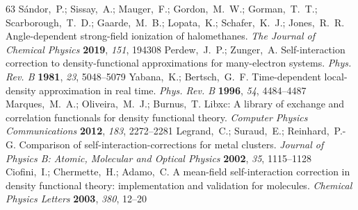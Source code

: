 \documentclass[journal=jacsat,manuscript=article]{achemso}
\begin{document}
\begin{mcitethebibliography}{63}
\EndOfBibitem
{}
S\'{a}ndor,~P.; Sissay,~A.; Mauger,~F.; Gordon,~M.~W.; Gorman,~T.~T.;
  Scarborough,~T.~D.; Gaarde,~M.~B.; Lopata,~K.; Schafer,~K.~J.; Jones,~R.~R.
  Angle-dependent strong-field ionization of halomethanes. \emph{The Journal of
  Chemical Physics} \textbf{2019}, \emph{151}, 194308\relax
\mciteBstWouldAddEndPuncttrue
\mciteSetBstMidEndSepPunct{\mcitedefaultmidpunct}
{\mcitedefaultendpunct}{\mcitedefaultseppunct}\relax
\EndOfBibitem
{}
Perdew,~J.~P.; Zunger,~A. Self-interaction correction to density-functional
  approximations for many-electron systems. \emph{Phys. Rev. B} \textbf{1981},
  \emph{23}, 5048--5079\relax
\mciteBstWouldAddEndPuncttrue
\mciteSetBstMidEndSepPunct{\mcitedefaultmidpunct}
{\mcitedefaultendpunct}{\mcitedefaultseppunct}\relax
\EndOfBibitem
{}
Yabana,~K.; Bertsch,~G.~F. Time-dependent local-density approximation in real
  time. \emph{Phys. Rev. B} \textbf{1996}, \emph{54}, 4484--4487\relax
\mciteBstWouldAddEndPuncttrue
\mciteSetBstMidEndSepPunct{\mcitedefaultmidpunct}
{\mcitedefaultendpunct}{\mcitedefaultseppunct}\relax
\EndOfBibitem
{}
Marques,~M.~A.; Oliveira,~M.~J.; Burnus,~T. Libxc: A library of exchange and
  correlation functionals for density functional theory. \emph{Computer Physics
  Communications} \textbf{2012}, \emph{183}, 2272--2281\relax
\mciteBstWouldAddEndPuncttrue
\mciteSetBstMidEndSepPunct{\mcitedefaultmidpunct}
{\mcitedefaultendpunct}{\mcitedefaultseppunct}\relax
\EndOfBibitem
{}
Legrand,~C.; Suraud,~E.; Reinhard,~P.-G. Comparison of
  self-interaction-corrections for metal clusters. \emph{Journal of Physics B:
  Atomic, Molecular and Optical Physics} \textbf{2002}, \emph{35},
  1115--1128\relax
\mciteBstWouldAddEndPuncttrue
\mciteSetBstMidEndSepPunct{\mcitedefaultmidpunct}
{\mcitedefaultendpunct}{\mcitedefaultseppunct}\relax
\EndOfBibitem
{}
Ciofini,~I.; Chermette,~H.; Adamo,~C. A mean-field self-interaction correction
  in density functional theory: implementation and validation for molecules.
  \emph{Chemical Physics Letters} \textbf{2003}, \emph{380}, 12--20\relax
\mciteBstWouldAddEndPuncttrue
\mciteSetBstMidEndSepPunct{\mcitedefaultmidpunct}

\end{mcitethebibliography}
\end{document}
